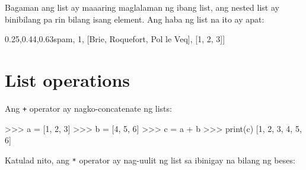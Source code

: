 \documentclass[10pt,]{book}
\newenvironment{Shaded}{}{}
\newcommand{\BuiltInTok}[1]{\textcolor[rgb]{0.00,0.50,0.00}{#1}}
\newcommand{\DecValTok}[1]{\textcolor[rgb]{0.25,0.63,0.44}{#1}}
\newcommand{\NormalTok}[1]{#1}
\newcommand{\OperatorTok}[1]{\textcolor[rgb]{0.40,0.40,0.40}{#1}}
\newcommand{\StringTok}[1]{\textcolor[rgb]{0.25,0.44,0.63}{#1}}
\begin{document}
Bagaman ang list ay maaaring maglalaman ng ibang list, ang nested list
ay binibilang pa rin bilang isang element. Ang haba ng list na ito ay
apat:

 

\begin{Shaded}
\begin{Highlighting}[]
\NormalTok{[}\StringTok{\textquotesingle{}spam\textquotesingle{}}\NormalTok{, }\DecValTok{1}\NormalTok{, [}\StringTok{\textquotesingle{}Brie\textquotesingle{}}\NormalTok{, }\StringTok{\textquotesingle{}Roquefort\textquotesingle{}}\NormalTok{, }\StringTok{\textquotesingle{}Pol le Veq\textquotesingle{}}\NormalTok{], [}\DecValTok{1}\NormalTok{, }\DecValTok{2}\NormalTok{, }\DecValTok{3}\NormalTok{]]}
\end{Highlighting}
\end{Shaded}

\section{List operations}\label{list-operations}


Ang \texttt{+} operator ay nagko-concatenate ng lists:

 

\begin{Shaded}
\begin{Highlighting}[]
\OperatorTok{\textgreater{}\textgreater{}\textgreater{}}\NormalTok{ a }\OperatorTok{=}\NormalTok{ [}\DecValTok{1}\NormalTok{, }\DecValTok{2}\NormalTok{, }\DecValTok{3}\NormalTok{]}
\OperatorTok{\textgreater{}\textgreater{}\textgreater{}}\NormalTok{ b }\OperatorTok{=}\NormalTok{ [}\DecValTok{4}\NormalTok{, }\DecValTok{5}\NormalTok{, }\DecValTok{6}\NormalTok{]}
\OperatorTok{\textgreater{}\textgreater{}\textgreater{}}\NormalTok{ c }\OperatorTok{=}\NormalTok{ a }\OperatorTok{+}\NormalTok{ b}
\OperatorTok{\textgreater{}\textgreater{}\textgreater{}} \BuiltInTok{print}\NormalTok{(c)}
\NormalTok{[}\DecValTok{1}\NormalTok{, }\DecValTok{2}\NormalTok{, }\DecValTok{3}\NormalTok{, }\DecValTok{4}\NormalTok{, }\DecValTok{5}\NormalTok{, }\DecValTok{6}\NormalTok{]}
\end{Highlighting}
\end{Shaded}

Katulad nito, ang \texttt{*} operator ay nag-uulit ng list sa ibinigay
na bilang ng beses:
\end{document}
